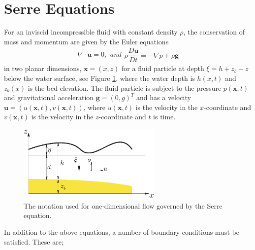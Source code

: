 \documentclass[preprint,sort&compress,1p]{article}
\begin{document}
\section{Serre Equations}
\label{section:Serre Equations}

For an inviscid incompressible fluid with constant density $\rho$, the conservation of mass and momentum are given by the Euler equations
\begin{subequations}
\begin{gather}
\nabla \cdot \mathbf{u} =  0,
\label{eq:Euler_continuity}
\end{gather}
and
\begin{gather}
\rho \dfrac{D\mathbf{u}}{Dt} = - \nabla p + \rho \mathbf{g}
\label{eq:Euler_momentum}
\end{gather}
\label{eq:Euler_governing_equations}
\end{subequations}
in two planar dimensions, $\mathbf{x} = (x,z)$ for a fluid particle at depth  $\xi = h + z_b - z$ below the water surface, see Figure \ref{fig:Notation}, where the water depth is $h(x,t)$ and $z_b(x)$ is the bed elevation. The fluid particle is subject to the pressure $p(\mathbf{x},t)$ and  gravitational acceleration $\mathbf{g} = (0,g)^T$ and has a velocity $\mathbf{u} = (u(\mathbf{x},t),v(\mathbf{x},t))$,  where $u(\mathbf{x},t)$ is the velocity in the $x$-coordinate and $v(\mathbf{x},t)$ is the velocity in the $z$-coordinate and $t$ is time.
\begin{figure}[htb]
\begin{center}
\includegraphics[width=7.0cm]{one-dimensional-axis_Serre_revised.eps}
\end{center}
\caption{The notation used for one-dimensional flow governed by the Serre equation.}
\label{fig:Notation}
\end{figure}
In addition to the above equations, a number of boundary conditions must be satisfied. These are;
\end{document}
